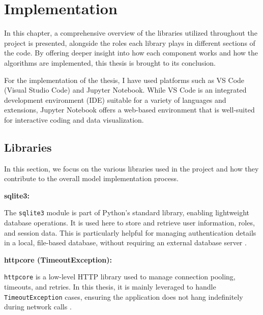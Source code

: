 \chapter{Implementation}

\label{Chapter4}


In this chapter, a comprehensive overview of the libraries utilized throughout the project is presented, 
alongside the roles each library plays in different sections of the code. By offering deeper insight 
into how each component works and how the algorithms are implemented, this thesis is brought to its conclusion.

For the implementation of the thesis, I have used platforms such as VS Code (Visual Studio Code) and Jupyter Notebook. 
While VS Code is an integrated development environment (IDE) suitable for a variety of languages and extensions, 
Jupyter Notebook offers a web-based environment that is well-suited for interactive coding and data visualization.

\vspace{1cm}
\section{Libraries}
In this section, we focus on the various libraries used in the project and how they contribute to the overall model implementation process.

\vspace{0.4cm}
\noindent\textbf{sqlite3:}

\noindent
The \texttt{sqlite3} module is part of Python’s standard library, enabling lightweight database operations. 
It is used here to store and retrieve user information, roles, and session data. This is particularly helpful 
for managing authentication details in a local, file-based database, without requiring an external database server \cite{pythonlibrary}.

\vspace{0.4cm}
\noindent\textbf{httpcore (TimeoutException):}

\noindent
\texttt{httpcore} is a low-level HTTP library used to manage connection pooling, timeouts, and retries. 
In this thesis, it is mainly leveraged to handle \texttt{TimeoutException} cases, ensuring the application 
does not hang indefinitely during network calls \cite{pythonlibrary}.

